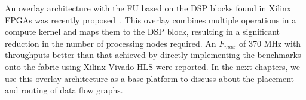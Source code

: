 An overlay architecture with the FU based on the DSP blocks found in Xilinx FPGAs was recently proposed~\cite{fccm2015-jain}.
This overlay combines multiple operations in a compute kernel and maps them to the DSP block, resulting in a significant reduction in the number of processing nodes required. 
An $F_{\mathit{max}}$ of 370 MHz with throughputs better than that achieved by directly implementing the benchmarks onto the fabric using Xilinx Vivado HLS were reported.
In the next chapters, we use this overlay architecture as a base platform to discuss about the placement and routing of data flow graphs.
%
